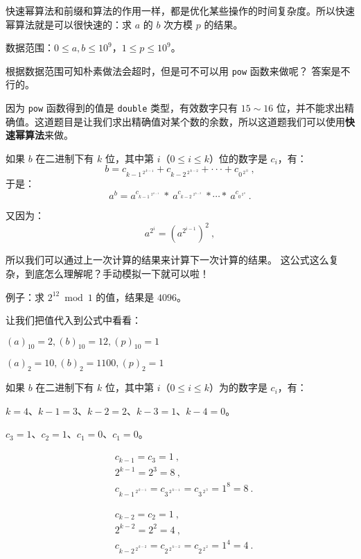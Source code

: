 
快速幂算法和前缀和算法的作用一样，都是优化某些操作的时间复杂度。所以快速幂算法就是可以很快速的：求 $a$ 的 $b$ 次方模 $p$ 的结果。

数据范围：$0 \le a,b \le 10^9$，$1 \le p \le 10^9$。

根据数据范围可知朴素做法会超时，但是可不可以用 \verb|pow| 函数来做呢？
答案是不行的。

因为 \verb|pow| 函数得到的值是 \verb|double| 类型，有效数字只有 $15\sim16$ 位，并不能求出精确值。这道题目是让我们求出精确值对某个数的余数，所以这道题我们可以使用\textbf{快速幂算法}来做。

如果 $b$ 在二进制下有 $k$ 位，其中第 $i$（$0 \le i \le k$）位的数字是 $c_i$，有：
\begin{equation}
b = c_{{k-1}^{\ 2^{\ k-1}}}+c_{{k-2}^{\ 2^{\ k-2}}}+\cdot\cdot\cdot+c_{{0}^{\ 2^{\ 0}}}~,
\end{equation}
于是：
\begin{equation}
a^b= a^{c_{{k-1}^{\ \ 2^{\ k-1}}}} \ *\  a^{c_{{k-2}^{\ \ 2^{\ k-2}}}} \ * \cdots * \ a^{c_{{0}^{\ 2^{\ 0}}}}~.
\end{equation}

又因为：
$$
a^{2^{i}} = (a^{2^{i-1}})^2~,
$$

所以我们可以通过上一次计算的结果来计算下一次计算的结果。
这公式这么复杂，到底怎么理解呢？手动模拟一下就可以啦！

例子：求 $2^{12} \bmod 1$ 的值，结果是 $4096$。

让我们把值代入到公式中看看：

$ (a) _ {10} =  2, (b) _ {10} = 12, (p) _ {10} = 1$

$ (a) _ 2 = 10, (b) _ 2 = 1100, (p) _ 2 = 1 $

如果 $b$ 在二进制下有 $k$ 位，其中第 $i$（$0 \le i \le k$）为的数字是 $c_i$，有：

$k = 4$、$k - 1 = 3$、$k - 2 = 2$、$k - 3 = 1$、$k - 4 = 0$。

$c_3 = 1$、$c_2 = 1$、$c_1 = 0$、$c_1 = 0$。

$$
\begin{aligned}
&c_{k - 1} = c_3 = 1~,\\
&2 ^ {k - 1} = 2 ^ 3 = 8~,\\
&c_{{k-1}^{\ 2^{\ k-1}}} = c_{{3}^{\ 2^{\ k-1}}} = c_{{3}^{\ 2^{\ 3}}} = 1^8 = 8~.
\end{aligned}
$$

$$
\begin{aligned}
&c_{k - 2} = c_2 = 1~,\\
&2 ^ {k - 2} = 2 ^ 2 = 4~,\\
&c_{{k-2}^{\ 2^{\ k-2}}} = c_{{2}^{\ 2^{\ k-2}}} = c_{{2}^{\ 2^{\ 2}}} = 1^4 = 4~.
\end{aligned}
$$

